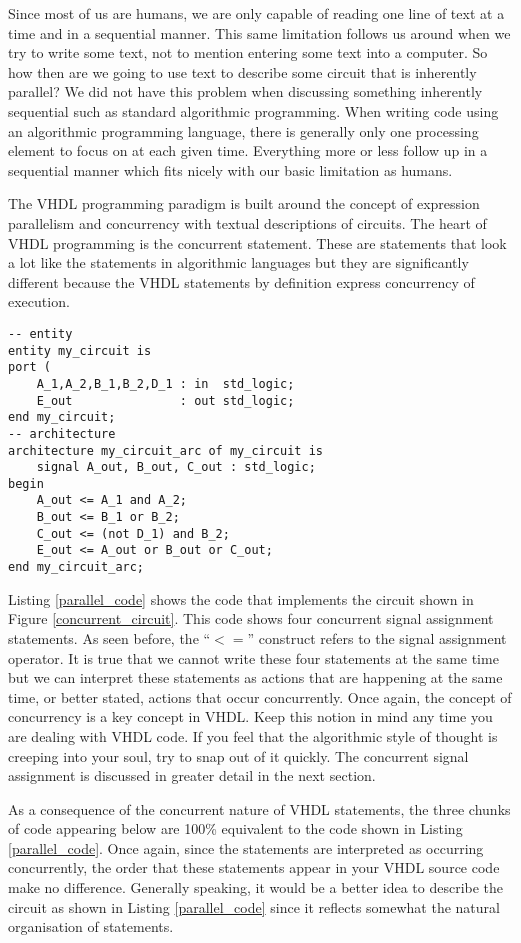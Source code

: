 Since most of us are humans, we are only capable of reading one line of text at a time and in a sequential manner. This same limitation follows us around when we try to write some text, not to mention entering some text into a computer. So how then are we going to use text to describe some circuit that is inherently parallel? We did not have this problem when discussing something inherently sequential such as standard algorithmic programming. When writing code using an algorithmic programming language, there is generally only one processing element to focus on at each given time. Everything more or less follow up in a sequential manner which fits nicely with our basic limitation as humans. 

The VHDL programming paradigm is built around the concept of expression parallelism and concurrency with textual descriptions of circuits. The heart of VHDL programming is the concurrent statement. These are statements that look a lot like the statements in algorithmic languages but they are significantly different because the VHDL statements by definition express concurrency of execution.
 
\begin{lstlisting}[label=parallel_code, caption=VHDL code for the circuit of Figure 4.1.]
-- entity
entity my_circuit is
port ( 
	A_1,A_2,B_1,B_2,D_1	: in  std_logic;
	E_out				: out std_logic;
end my_circuit;
-- architecture
architecture my_circuit_arc of my_circuit is
	signal A_out, B_out, C_out : std_logic;
begin
	A_out <= A_1 and A_2;   
	B_out <= B_1 or B_2; 
	C_out <= (not D_1) and B_2; 
	E_out <= A_out or B_out or C_out;
end my_circuit_arc;
\end{lstlisting}

Listing \ref{parallel_code} shows the code that implements the circuit shown in Figure \ref{concurrent_circuit}. This code shows four concurrent signal assignment statements. As seen before, the ``$<=$'' construct refers to the signal assignment operator. It is true that we cannot write these four statements at the same time but we can interpret these statements as actions that are happening at the same time, or better stated, actions that occur concurrently. Once again, the concept of concurrency is a key concept in VHDL. Keep this notion in mind any time you are dealing with VHDL code. If you feel that the algorithmic style of thought is creeping into your soul, try to snap out of it quickly. The concurrent signal assignment is discussed in greater detail in the next section. 

As a consequence of the concurrent nature of VHDL statements, the three chunks of code appearing below are 100\% equivalent to the code shown in Listing \ref{parallel_code}. Once again, since the statements are interpreted as occurring concurrently, the order that these statements appear in your VHDL source code make no difference. Generally speaking, it would be a better idea to describe the circuit as shown in Listing \ref{parallel_code} since it reflects somewhat the natural organisation of statements.

